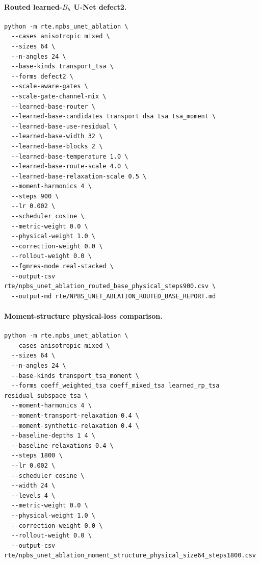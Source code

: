 \documentclass[11pt]{article}
\begin{document}
\paragraph{Routed learned-\(B_h\) U-Net defect2.}
\begin{verbatim}
python -m rte.npbs_unet_ablation \
  --cases anisotropic mixed \
  --sizes 64 \
  --n-angles 24 \
  --base-kinds transport_tsa \
  --forms defect2 \
  --scale-aware-gates \
  --scale-gate-channel-mix \
  --learned-base-router \
  --learned-base-candidates transport dsa tsa tsa_moment \
  --learned-base-use-residual \
  --learned-base-width 32 \
  --learned-base-blocks 2 \
  --learned-base-temperature 1.0 \
  --learned-base-route-scale 4.0 \
  --learned-base-relaxation-scale 0.5 \
  --moment-harmonics 4 \
  --steps 900 \
  --lr 0.002 \
  --scheduler cosine \
  --metric-weight 0.0 \
  --physical-weight 1.0 \
  --correction-weight 0.0 \
  --rollout-weight 0.0 \
  --fgmres-mode real-stacked \
  --output-csv rte/npbs_unet_ablation_routed_base_physical_steps900.csv \
  --output-md rte/NPBS_UNET_ABLATION_ROUTED_BASE_REPORT.md
\end{verbatim}

\paragraph{Moment-structure physical-loss comparison.}
\begin{verbatim}
python -m rte.npbs_unet_ablation \
  --cases anisotropic mixed \
  --sizes 64 \
  --n-angles 24 \
  --base-kinds transport_tsa_moment \
  --forms coeff_weighted_tsa coeff_mixed_tsa learned_rp_tsa residual_subspace_tsa \
  --moment-harmonics 4 \
  --moment-transport-relaxation 0.4 \
  --moment-synthetic-relaxation 0.4 \
  --baseline-depths 1 4 \
  --baseline-relaxations 0.4 \
  --steps 1800 \
  --lr 0.002 \
  --scheduler cosine \
  --width 24 \
  --levels 4 \
  --metric-weight 0.0 \
  --physical-weight 1.0 \
  --correction-weight 0.0 \
  --rollout-weight 0.0 \
  --output-csv rte/npbs_unet_ablation_moment_structure_physical_size64_steps1800.csv
\end{verbatim}
\end{document}
